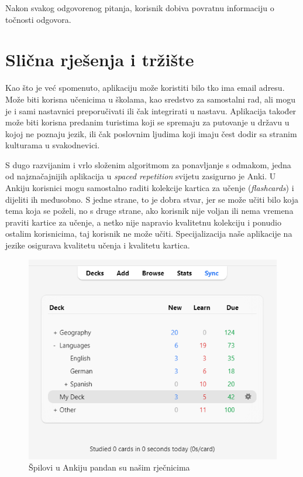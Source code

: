 Nakon svakog odgovorenog pitanja, korisnik dobiva povratnu informaciju o točnosti odgovora.

\eject

\section{Slična rješenja i tržište}

Kao što je već spomenuto, aplikaciju može koristiti bilo tko ima email adresu. Može biti korisna učenicima u školama, 
kao sredstvo za samostalni rad, ali mogu je i sami nastavnici preporučivati ili čak integrirati u nastavu. Aplikacija također može biti 
korisna predanim turistima koji se spremaju za putovanje u državu u kojoj ne poznaju jezik, ili čak poslovnim ljudima koji imaju čest dodir 
sa stranim kulturama u svakodnevici. 

S dugo razvijanim i vrlo složenim algoritmom za ponavljanje s odmakom, jedna od najznačajnijih aplikacija u \textit{spaced repetition} svijetu zasigurno je Anki. U Ankiju korisnici mogu samostalno 
raditi kolekcije kartica za učenje (\textit{flashcards}) i dijeliti ih međusobno. S jedne strane, to je dobra stvar, jer se može učiti bilo koja tema koja 
se poželi, no s druge strane, ako korisnik nije voljan ili nema vremena praviti kartice za učenje, a netko nije napravio kvalitetnu kolekciju i 
ponudio ostalim korisnicima, taj korisnik ne može učiti. Specijalizacija naše aplikacije na jezike osigurava kvalitetu učenja i kvalitetu kartica.

\begin{figure}[H]
	\includegraphics[scale=0.8]{slike/anki_screen.png} 
	\centering
	\caption{Špilovi u Ankiju pandan su našim rječnicima}
	\label{fig:ankideck}
\end{figure}

\eject